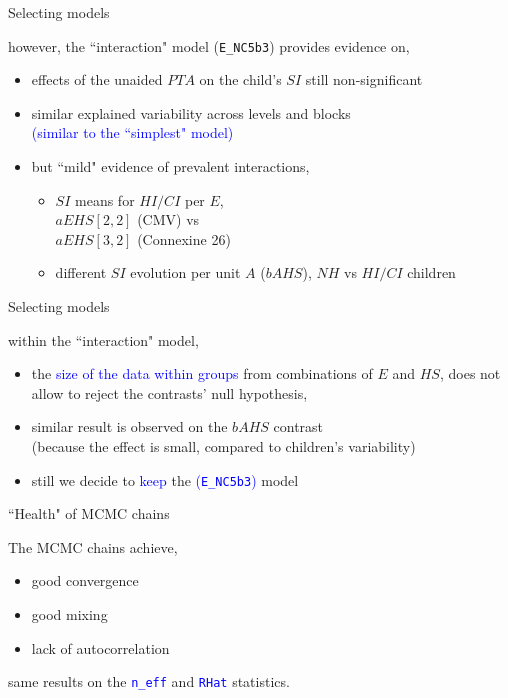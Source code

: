 \begin{lhframe}[rhgraphic={\texttt{[image: select\_model2.png]}}]
	{Selecting models}
	
	however, the ``interaction" model (\texttt{E\_NC5b3}) provides evidence on,
	\begin{itemize}
		\item effects of the unaided $PTA$ on the child's $SI$ still non-significant
		\item similar explained variability across levels and blocks \\
		{\small \textcolor{blue}{(similar to the ``simplest" model)}}
		\item but ``mild" evidence of prevalent interactions,
		\begin{itemize}
			\item $SI$ means for $HI/CI$ per $E$, \\
			$aEHS[2,2]$ (CMV) vs \\
			$aEHS[3,2]$ (Connexine 26)
			\item different $SI$ evolution per unit $A$ ($bAHS$), $NH$ vs $HI/CI$ children
		\end{itemize}
	\end{itemize}
\end{lhframe}
%
%
\begin{lhframe}[rhgraphic={\texttt{[image: contrasts.png]}}]
	{Selecting models}
	
	within the ``interaction" model,
	\begin{itemize}
		\item the \textcolor{blue}{size of the data within groups} from combinations of $E$ and $HS$, does not allow to reject the contrasts' null hypothesis,
		\item similar result is observed on the $bAHS$ contrast \\
		{\small (because the effect is small, compared to children's variability)}
		\item still we decide to \textcolor{blue}{keep} the \textcolor{blue}{(\texttt{E\_NC5b3})} model 
	\end{itemize}
\end{lhframe}
%
%
\begin{lhframe}[rhgraphic={\texttt{[image: chains\_real1.pdf]}}]
	{``Health" of MCMC chains}
	
	The MCMC chains achieve,
	\begin{itemize}
		\item good convergence
		\item good mixing
		\item lack of autocorrelation
	\end{itemize}
	
	same results on the \textcolor{blue}{ \texttt{n\_eff} } and \textcolor{blue}{ \texttt{RHat} } statistics.
\end{lhframe}
